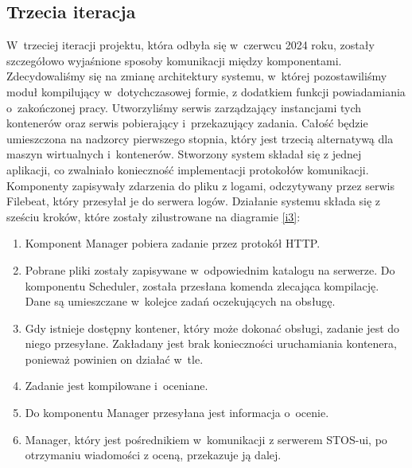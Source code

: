 \subsection{Trzecia iteracja}
W~trzeciej iteracji projektu, która odbyła się w~czerwcu 2024 roku, zostały szczegółowo wyjaśnione sposoby komunikacji między komponentami. Zdecydowaliśmy się na zmianę architektury systemu, w~której pozostawiliśmy moduł kompilujący w~dotychczasowej formie, z dodatkiem funkcji powiadamiania o~zakończonej pracy. Utworzyliśmy serwis zarządzający instancjami tych kontenerów oraz serwis pobierający i~przekazujący zadania. Całość będzie umieszczona na nadzorcy pierwszego stopnia, który jest trzecią alternatywą dla maszyn wirtualnych i~kontenerów. Stworzony system składał się z jednej aplikacji, co zwalniało konieczność implementacji protokołów komunikacji. Komponenty zapisywały zdarzenia do pliku z logami, odczytywany przez serwis Filebeat, który przesyłał je do serwera logów. Działanie systemu składa się z sześciu kroków, które zostały zilustrowane na diagramie \ref{i3}:
\begin{enumerate}
	\item Komponent Manager pobiera zadanie przez protokół HTTP.
	\item Pobrane pliki zostały zapisywane w~odpowiednim katalogu na serwerze. Do komponentu Scheduler, została przesłana komenda zlecająca kompilację. Dane są umieszczane w~kolejce zadań oczekujących na obsługę.
	\item Gdy istnieje dostępny kontener, który może dokonać obsługi, zadanie jest do niego przesyłane. Zakładany jest brak konieczności uruchamiania kontenera, ponieważ powinien on działać w~tle.
	\item Zadanie jest kompilowane i~oceniane.
	\item Do komponentu Manager przesyłana jest informacja o~ocenie.
	\item Manager, który jest pośrednikiem w~komunikacji z serwerem STOS-ui, po otrzymaniu wiadomości z oceną, przekazuje ją dalej.
\end{enumerate}
